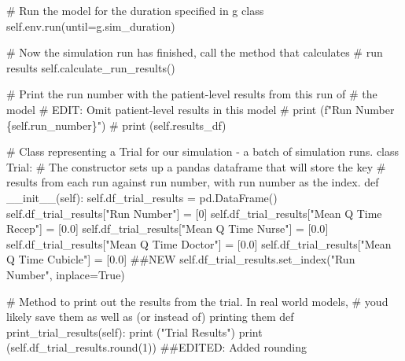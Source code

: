 \documentclass[
  letterpaper,
  DIV=11,
  numbers=noendperiod]{scrreprt}
\newenvironment{Shaded}{\begin{snugshade}}{\end{snugshade}}
\newcommand{\BuiltInTok}[1]{\textcolor[rgb]{0.00,0.23,0.31}{#1}}
\newcommand{\CommentTok}[1]{\textcolor[rgb]{0.37,0.37,0.37}{#1}}
\newcommand{\DecValTok}[1]{\textcolor[rgb]{0.68,0.00,0.00}{#1}}
\newcommand{\FloatTok}[1]{\textcolor[rgb]{0.68,0.00,0.00}{#1}}
\newcommand{\FunctionTok}[1]{\textcolor[rgb]{0.28,0.35,0.67}{#1}}
\newcommand{\KeywordTok}[1]{\textcolor[rgb]{0.00,0.23,0.31}{#1}}
\newcommand{\NormalTok}[1]{\textcolor[rgb]{0.00,0.23,0.31}{#1}}
\newcommand{\OperatorTok}[1]{\textcolor[rgb]{0.37,0.37,0.37}{#1}}
\newcommand{\StringTok}[1]{\textcolor[rgb]{0.13,0.47,0.30}{#1}}
\newcommand{\VariableTok}[1]{\textcolor[rgb]{0.07,0.07,0.07}{#1}}
\begin{document}
\begin{tcolorbox}
\begin{Shaded}
\begin{Highlighting}[]
        \CommentTok{\# Run the model for the duration specified in g class}
        \VariableTok{self}\NormalTok{.env.run(until}\OperatorTok{=}\NormalTok{g.sim\_duration)}

        \CommentTok{\# Now the simulation run has finished, call the method that calculates}
        \CommentTok{\# run results}
        \VariableTok{self}\NormalTok{.calculate\_run\_results()}

        \CommentTok{\# Print the run number with the patient{-}level results from this run of}
        \CommentTok{\# the model}
        \CommentTok{\# EDIT: Omit patient{-}level results in this model}
        \CommentTok{\# print (f"Run Number \{self.run\_number\}")}
        \CommentTok{\# print (self.results\_df)}

\CommentTok{\# Class representing a Trial for our simulation {-} a batch of simulation runs.}
\KeywordTok{class}\NormalTok{ Trial:}
    \CommentTok{\# The constructor sets up a pandas dataframe that will store the key}
    \CommentTok{\# results from each run against run number, with run number as the index.}
    \KeywordTok{def}  \FunctionTok{\_\_init\_\_}\NormalTok{(}\VariableTok{self}\NormalTok{):}
        \VariableTok{self}\NormalTok{.df\_trial\_results }\OperatorTok{=}\NormalTok{ pd.DataFrame()}
        \VariableTok{self}\NormalTok{.df\_trial\_results[}\StringTok{"Run Number"}\NormalTok{] }\OperatorTok{=}\NormalTok{ [}\DecValTok{0}\NormalTok{]}
        \VariableTok{self}\NormalTok{.df\_trial\_results[}\StringTok{"Mean Q Time Recep"}\NormalTok{] }\OperatorTok{=}\NormalTok{ [}\FloatTok{0.0}\NormalTok{]}
        \VariableTok{self}\NormalTok{.df\_trial\_results[}\StringTok{"Mean Q Time Nurse"}\NormalTok{] }\OperatorTok{=}\NormalTok{ [}\FloatTok{0.0}\NormalTok{]}
        \VariableTok{self}\NormalTok{.df\_trial\_results[}\StringTok{"Mean Q Time Doctor"}\NormalTok{] }\OperatorTok{=}\NormalTok{ [}\FloatTok{0.0}\NormalTok{]}
        \VariableTok{self}\NormalTok{.df\_trial\_results[}\StringTok{"Mean Q Time Cubicle"}\NormalTok{] }\OperatorTok{=}\NormalTok{ [}\FloatTok{0.0}\NormalTok{] }\CommentTok{\#\#NEW}
        \VariableTok{self}\NormalTok{.df\_trial\_results.set\_index(}\StringTok{"Run Number"}\NormalTok{, inplace}\OperatorTok{=}\VariableTok{True}\NormalTok{)}

    \CommentTok{\# Method to print out the results from the trial.  In real world models,}
    \CommentTok{\# you\textquotesingle{}d likely save them as well as (or instead of) printing them}
    \KeywordTok{def}\NormalTok{ print\_trial\_results(}\VariableTok{self}\NormalTok{):}
        \BuiltInTok{print}\NormalTok{ (}\StringTok{"Trial Results"}\NormalTok{)}
        \BuiltInTok{print}\NormalTok{ (}\VariableTok{self}\NormalTok{.df\_trial\_results.}\BuiltInTok{round}\NormalTok{(}\DecValTok{1}\NormalTok{)) }\CommentTok{\#\#EDITED: Added rounding}


\end{Highlighting}
\end{Shaded}
\end{tcolorbox}
\end{document}
